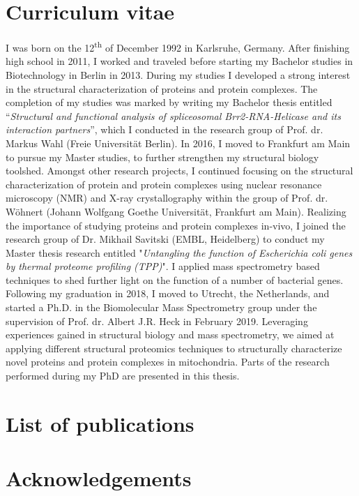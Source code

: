 \renewcommand{\bibpreamble}{}
\renewcommand{\bibpostamble}{}
\renewcommand\bibfont{\normalfont\fontsize{8.58}{8}\selectfont}

 \label{ch-7}
\clearpage
\section{Curriculum vitae}
I was born on the 12\textsuperscript{th} of December 1992 in Karlsruhe, Germany. After finishing high school in 2011, I worked and traveled before starting my Bachelor studies in Biotechnology in Berlin in 2013. During my studies I developed a strong interest in the structural characterization of proteins and protein complexes. The completion of my studies was marked by writing my Bachelor thesis entitled “\emph{Structural and functional analysis of spliceosomal Brr2-RNA-Helicase and its interaction partners}”, which I conducted in the research group of Prof. dr. Markus Wahl (Freie Universität Berlin). In 2016, I moved to Frankfurt am Main to pursue my Master studies, to further strengthen my structural biology toolshed. Amongst other research projects, I continued focusing on the structural characterization of protein and protein complexes using nuclear resonance microscopy (NMR) and X-ray crystallography within the group of Prof. dr. Wöhnert (Johann Wolfgang Goethe Universität, Frankfurt am Main). Realizing the importance of studying proteins and protein complexes in-vivo, I joined the research group of Dr. Mikhail Savitski (EMBL, Heidelberg) to conduct my Master thesis research entitled "\emph{Untangling the function of Escherichia coli genes by thermal proteome profiling (TPP)}". I applied mass spectrometry based techniques to shed further light on the function of a number of bacterial genes. Following my graduation in 2018, I moved to Utrecht, the Netherlands, and started a Ph.D. in the Biomolecular Mass Spectrometry group under the supervision of Prof. dr. Albert J.R. Heck in February 2019. Leveraging experiences gained in structural biology and mass spectrometry, we aimed at applying different structural proteomics techniques to structurally characterize novel proteins and protein complexes in mitochondria. Parts of the research performed during my PhD are presented in this thesis.
\clearpage
\section{List of publications}
\nocite{*}


\clearpage
\section{Acknowledgements}
